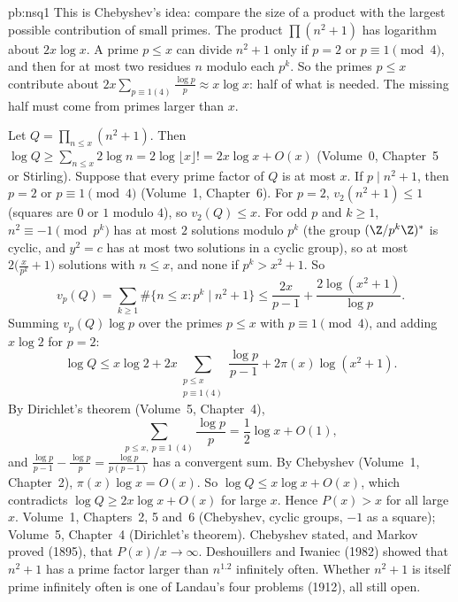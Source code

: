 \begin{solution}{pb:nsq1}
\idea This is Chebyshev's idea: compare the size of a product with the largest possible contribution of small primes. The
product $\prod(n^2+1)$ has logarithm about $2x\log x$. A prime $p\le x$ can divide $n^2+1$ only if $p=2$ or $p\equiv1\pmod4$, and
then for at most two residues $n$ modulo each $p^k$. So the primes $p\le x$ contribute about $2x\sum_{p\equiv1(4)}\frac{\log p}p\approx x\log x$:
half of what is needed. The missing half must come from primes larger than $x$.

\writeup Let $Q=\prod_{n\le x}(n^2+1)$. Then $\log Q\ge\sum_{n\le x}2\log n=2\log\lfloor x\rfloor!=2x\log x+O(x)$ (Volume~0, Chapter~5 or
Stirling). Suppose that every prime factor of $Q$ is at most $x$. If $p\mid n^2+1$, then $p=2$ or $p\equiv1\pmod4$ (Volume~1, Chapter~6).
For $p=2$, $v_2(n^2+1)\le1$ (squares are $0$ or $1$ modulo $4$), so $v_2(Q)\le x$. For odd $p$ and $k\ge1$, $n^2\equiv-1\pmod{p^k}$
has at most $2$ solutions modulo $p^k$ (the group $(\Z/p^k\Z)^*$ is cyclic, and $y^2=c$ has at most two solutions in a cyclic
group), so at most $2\bigl(\frac x{p^k}+1\bigr)$ solutions with $n\le x$, and none if $p^k>x^2+1$. So
\[
v_p(Q)=\sum_{k\ge1}\#\{n\le x:p^k\mid n^2+1\}\le\frac{2x}{p-1}+\frac{2\log(x^2+1)}{\log p}.
\]
Summing $v_p(Q)\log p$ over the primes $p\le x$ with $p\equiv1\pmod4$, and adding $x\log2$ for $p=2$:
\[
\log Q\le x\log2+2x\sum_{\substack{p\le x\\p\equiv1(4)}}\frac{\log p}{p-1}+2\pi(x)\log(x^2+1).
\]
By Dirichlet's theorem (Volume~5, Chapter~4),
\[
\sum_{p\le x,\ p\equiv1\ (4)}\frac{\log p}p=\frac12\log x+O(1),
\]
and
$\frac{\log p}{p-1}-\frac{\log p}p=\frac{\log p}{p(p-1)}$ has a convergent sum. By Chebyshev (Volume~1, Chapter~2), $\pi(x)\log x=O(x)$. So
$\log Q\le x\log x+O(x)$, which contradicts $\log Q\ge2x\log x+O(x)$ for large $x$. Hence $P(x)>x$ for all large $x$.
\tools Volume~1, Chapters~2, 5 and~6 (Chebyshev, cyclic groups, $-1$ as a square); Volume~5, Chapter~4 (Dirichlet's theorem).
\leads Chebyshev stated, and Markov proved (1895), that $P(x)/x\to\infty$. Deshouillers and Iwaniec (1982) showed that $n^2+1$ has a
prime factor larger than $n^{1.2}$ infinitely often. Whether $n^2+1$ is itself prime infinitely often is one of Landau's four
problems (1912), all still open.
\end{solution}

